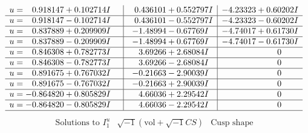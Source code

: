 \documentclass[1p]{elsarticle_modified}
\theoremstyle{definition}
\newcommand{\I}{\sqrt{-1}}
\begin{document}
$$\begin{array}{c|c|c}
\begin{aligned}
u &= \phantom{-}0.918147 + 0.102714 I\end{aligned}
 & \phantom{-}0.436101 + 0.552797 I & -4.23323 + 0.60202 I \\ \hline\begin{aligned}
u &= \phantom{-}0.918147 - 0.102714 I\end{aligned}
 & \phantom{-}0.436101 - 0.552797 I & -4.23323 - 0.60202 I \\ \hline\begin{aligned}
u &= \phantom{-}0.837889 + 0.209909 I\end{aligned}
 & -1.48994 - 0.67769 I & -4.74017 + 0.61730 I \\ \hline\begin{aligned}
u &= \phantom{-}0.837889 - 0.209909 I\end{aligned}
 & -1.48994 + 0.67769 I & -4.74017 - 0.61730 I \\ \hline\begin{aligned}
u &= \phantom{-}0.846308 + 0.782773 I\end{aligned}
 & \phantom{-}3.69266 + 2.68084 I & \phantom{-0.000000 } 0 \\ \hline\begin{aligned}
u &= \phantom{-}0.846308 - 0.782773 I\end{aligned}
 & \phantom{-}3.69266 - 2.68084 I & \phantom{-0.000000 } 0 \\ \hline\begin{aligned}
u &= \phantom{-}0.891675 + 0.767032 I\end{aligned}
 & -0.21663 - 2.90039 I & \phantom{-0.000000 } 0 \\ \hline\begin{aligned}
u &= \phantom{-}0.891675 - 0.767032 I\end{aligned}
 & -0.21663 + 2.90039 I & \phantom{-0.000000 } 0 \\ \hline\begin{aligned}
u &= -0.864820 + 0.805829 I\end{aligned}
 & \phantom{-}4.66036 + 2.29542 I & \phantom{-0.000000 } 0 \\ \hline\begin{aligned}
u &= -0.864820 - 0.805829 I\end{aligned}
 & \phantom{-}4.66036 - 2.29542 I & \phantom{-0.000000 } 0\\
 \hline 
 \end{array}$$\newpage$$\begin{array}{c|c|c}  
\text{Solutions to }I^u_{1}& \I (\text{vol} + \sqrt{-1}CS) & \text{Cusp shape}\\

\end{array}$$
\end{document}
